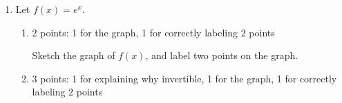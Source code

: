 \documentclass{article}
\begin{document}
\begin{enumerate}
\begin{enumerate}
    \begin{problem}[\nstretch{0.5}]
      If $g$ is the inverse of your restricted $f$, what are the domain and range of $g$?
    \end{problem}

    \begin{solution}
      The domain of $f$ is $(2, \infty)$ and the range of $f$ is $(-\infty, 5)$. 
      So the domain of $g$ is $(-\infty, 5)$ and the range of $g$ is $(2, \infty)$.
    \end{solution}

  \end{enumerate}

\item 

  Let $f(x) = e^x$.  

  \begin{enumerate}

  \item

    \begin{grading}
      2 points: 1 for the graph, 1 for correctly labeling 2 points
    \end{grading}

    \begin{problem}[\vfill]
      Sketch the graph of $f(x)$, and label two points on the graph. 
    \end{problem}

    \begin{solution}
      \begin{center}
      \end{center}
    \end{solution}

  \item

    \begin{grading}
      3 points: 1 for explaining why invertible, 1 for the graph, 1 for correctly labeling 2 points
    \end{grading}


\end{enumerate}
\end{enumerate}
\end{document}
